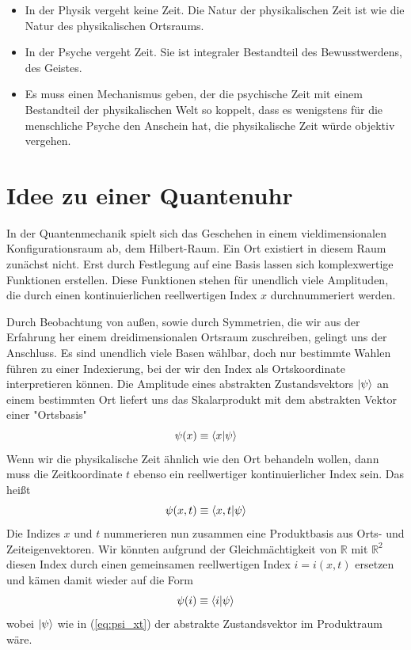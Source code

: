 \documentclass[12pt]{article}
\begin{document}
\begin{itemize}
\item In der Physik vergeht keine Zeit. Die Natur der physikalischen Zeit ist wie die Natur des physikalischen Ortsraums.
\item In der Psyche vergeht Zeit. Sie ist integraler Bestandteil des Bewusstwerdens, des Geistes. 
\item Es muss einen Mechanismus geben, der die psychische Zeit mit einem Bestandteil der physikalischen Welt so koppelt, dass es wenigstens für die menschliche Psyche den Anschein hat, die physikalische Zeit würde objektiv vergehen.
\end{itemize}

\section{Idee zu einer Quantenuhr}

In der Quantenmechanik spielt sich das Geschehen in einem vieldimensionalen Konfigurationsraum ab, dem Hilbert-Raum. Ein Ort existiert in diesem Raum zunächst nicht. Erst durch Festlegung auf eine Basis lassen sich komplexwertige Funktionen erstellen. Diese Funktionen stehen für unendlich viele Amplituden, die durch einen kontinuierlichen reellwertigen Index $x$ durchnummeriert werden.

Durch Beobachtung von außen, sowie durch Symmetrien, die wir aus der Erfahrung her einem dreidimensionalen Ortsraum zuschreiben, gelingt uns der Anschluss. Es sind unendlich viele Basen wählbar, doch nur bestimmte Wahlen führen zu einer Indexierung, bei der wir den Index als Ortskoordinate interpretieren können. Die Amplitude eines abstrakten Zustandsvektors $\ket{\psi}$ an einem bestimmten Ort liefert uns das Skalarprodukt mit dem abstrakten Vektor einer "Ortsbasis"
\begin{equation} 
\psi(x) \equiv \bra{x}\ket{\psi} 
\end{equation}
Wenn wir die physikalische Zeit ähnlich wie den Ort behandeln wollen, dann muss die Zeitkoordinate $t$ ebenso ein reellwertiger kontinuierlicher Index sein. Das heißt
\begin{equation} 
\label{eq:psi_xt}
\psi(x,t) \equiv \bra{x,t}\ket{\psi} 
\end{equation}
Die Indizes $x$ und $t$ nummerieren nun zusammen eine Produktbasis aus Orts- und Zeiteigenvektoren. Wir könnten aufgrund der Gleichmächtigkeit von $\mathbb{R}$ mit $\mathbb{R}^2$ diesen Index durch einen gemeinsamen reellwertigen Index $i = i(x,t)$ ersetzen und kämen damit wieder auf die Form
\begin{equation}
\psi(i) \equiv \bra{i}\ket{\psi} 
\end{equation}
wobei $\ket{\psi}$ wie in (\ref{eq:psi_xt}) der abstrakte Zustandsvektor im Produktraum wäre.
\end{document}
